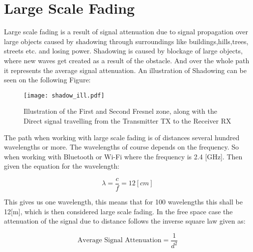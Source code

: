 \chapter{Large Scale Fading}
\label{larg_fad}

Large scale fading \citep{large_scale_fade} \citep{large_scale_fade2} is a result of signal attenuation due to signal propagation over large objects caused by shadowing through surroundings like buildings,hills,trees, streets etc. and losing power. Shadowing is caused by blockage of large objects, where new waves get created as a result of the obstacle. %
 And over the whole path it represents the average signal attenuation. An illustration of Shadowing can be seen on the following Figure:
 
\begin{figure}[H]
\centering
\texttt{[image: shadow\_ill.pdf]}
\caption{Illustration of the First and Second Fresnel zone, along with the Direct signal travelling from the Transmitter TX to the Receiver RX}
\label{dijdk_1}
\end{figure}

 The path when working with large scale fading is of distances several hundred wavelengths or more. The wavelengths of course depends on the frequency. So when working with Bluetooth or Wi-Fi where the frequency is 2.4 [GHz]. 
Then given the equation for the wavelength:

\begin{equation}
\lambda = \frac{c}{f} = 12 [cm] 
\end{equation}

This gives us one wavelength, this means that for 100 wavelengths this shall be 12[m], which is then considered large scale fading. In the free space case %
the attenuation of the signal due to distance follows the inverse square law given as:

\begin{equation}
\text{Average Signal Attenuation} = \frac{1}{d^{2}} 
\label{inverse_square_law}
\end{equation}  

